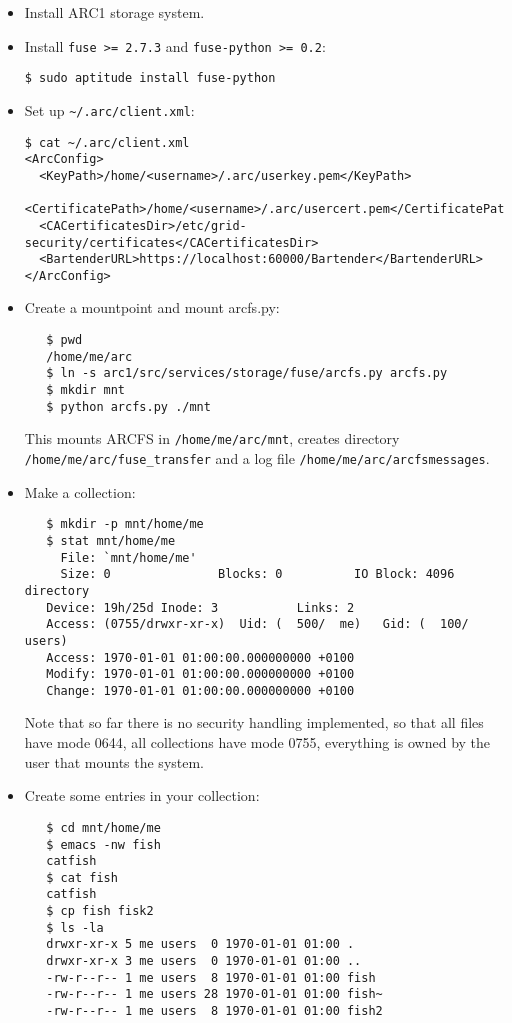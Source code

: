 \documentclass{book}
\begin{document}
\begin{itemize}
\item Install ARC1 storage system.

\item Install \verb!fuse >= 2.7.3! and \verb!fuse-python >= 0.2!:
\begin{verbatim}
$ sudo aptitude install fuse-python
\end{verbatim}

\item Set up \verb!~/.arc/client.xml!:

\begin{verbatim}
$ cat ~/.arc/client.xml 
<ArcConfig>
  <KeyPath>/home/<username>/.arc/userkey.pem</KeyPath>
  <CertificatePath>/home/<username>/.arc/usercert.pem</CertificatePath>
  <CACertificatesDir>/etc/grid-security/certificates</CACertificatesDir>
  <BartenderURL>https://localhost:60000/Bartender</BartenderURL>
</ArcConfig>
\end{verbatim}

\item Create a mountpoint and mount arcfs.py:
\begin{verbatim}
   $ pwd
   /home/me/arc
   $ ln -s arc1/src/services/storage/fuse/arcfs.py arcfs.py
   $ mkdir mnt
   $ python arcfs.py ./mnt 
\end{verbatim}
This mounts ARCFS in \verb!/home/me/arc/mnt!, creates directory
\verb!/home/me/arc/fuse_transfer! and a log file
\verb!/home/me/arc/arcfsmessages!.

\item Make a collection:
\begin{verbatim}   
   $ mkdir -p mnt/home/me
   $ stat mnt/home/me
     File: `mnt/home/me'
     Size: 0               Blocks: 0          IO Block: 4096   directory
   Device: 19h/25d Inode: 3           Links: 2
   Access: (0755/drwxr-xr-x)  Uid: (  500/  me)   Gid: (  100/   users)
   Access: 1970-01-01 01:00:00.000000000 +0100
   Modify: 1970-01-01 01:00:00.000000000 +0100
   Change: 1970-01-01 01:00:00.000000000 +0100
\end{verbatim}
Note that so far there is no security handling implemented, so
that all files have mode 0644, all collections have mode 0755,
everything is owned by the user that mounts the system.

\item Create some entries in your collection:
\begin{verbatim}
   $ cd mnt/home/me
   $ emacs -nw fish
   catfish
   $ cat fish
   catfish
   $ cp fish fisk2
   $ ls -la
   drwxr-xr-x 5 me users  0 1970-01-01 01:00 .
   drwxr-xr-x 3 me users  0 1970-01-01 01:00 ..
   -rw-r--r-- 1 me users  8 1970-01-01 01:00 fish
   -rw-r--r-- 1 me users 28 1970-01-01 01:00 fish~
   -rw-r--r-- 1 me users  8 1970-01-01 01:00 fish2
\end{verbatim}


\end{itemize}
\end{document}
